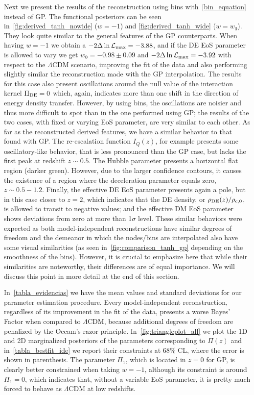 \documentclass[twocolumn,a4paper,reprint,amssymb,aps,prd,groupedaddress,superscriptaddress,nofootinbib]{revtex4-2}
\begin{document}
Next we present the results of the reconstruction using bins with~\cref{bin_equation} instead of GP.
The functional posteriors can be seen in~\cref{fig:derived_tanh_nowide} ($w=-1$) and
\cref{fig:derived_tanh_wide} ($w = w_0$). They look quite similar to the general features of the GP
counterparts. When having $w = -1$ we obtain a $-2\Delta \ln \mathcal{L_{\rm max}} = -3.88$, and if the
DE EoS parameter is allowed to vary  we get $w_0 = -0.98\pm 0.09$ and $-2\Delta\ln \mathcal{L_{\rm max}} = -3.92$
with respect to the $\Lambda$CDM scenario, improving the fit of the data and also performing
slightly similar the reconstruction made with the GP interpolation.
The results for this case also present oscillations around the null value of the interaction kernel
$\Pi_{\rm DE}=0$ which, again, indicates more than one shift in the direction of energy density transfer.
However, by using bins, the oscillations are noisier and thus more difficult to spot than in the one
performed using GP; the results of the two cases, with fixed or varying EoS parameter, are very
similar to each other. As far as the reconstructed derived features, we have a similar behavior to
that found with GP. The re-escalation function $I_Q(z)$, for example presents some oscillatory-like
behavior, that is less pronounced than the GP case, but lacks the first peak at
redshift $z \sim 0.5$. The Hubble parameter presents a horizontal flat region (darker green).
However, due to the larger confidence contours, it causes the existence of a region
where the deceleration parameter equals zero, $z\sim 0.5-1.2$.
Finally, the effective DE EoS parameter presents again a pole, but in this case closer to $z=2$, {which indicates that the DE density, or $\rho_{\rm DE}(z)/\rho_{\rm c,0}$, is allowed to transit to negative values};
and the effective DM EoS parameter shows deviations from zero at more than 1$\sigma$ level.
%
These similar behaviors were expected as both model-independent reconstructions have similar
degrees of freedom and the demeanor in which the nodes/bins are interpolated also have some
visual similarities (as seen in~\cref{fig:comparison_tanh_gp} depending on the smoothness of the bins). {However, it is crucial to emphasize here that while their similarities are noteworthy, their differences are of equal importance. We will discuss this point in more detail at the end of this section.}



In~\cref{tabla_evidencias} we have the mean values and standard deviations for our parameter
estimation procedure. Every model-independent reconstruction, regardless of its improvement in the fit of the data,
presents a worse Bayes' Factor when compared to $\Lambda$CDM, because additional degrees of freedom
are penalized by the Occam's razor principle. In~\cref{fig:triangleplot_all} we plot the 1D and
2D marginalized posteriors of the parameters corresponding to $\Pi(z)$ and in~\cref{tabla_bestfit_ide}
we report their
constraints at 68\% CL, where the error is shown in parenthesis. The parameter $\Pi_1$, which is located in $z=0$ for GP, is clearly better
constrained when taking $w=-1$, although its constraint is around $\Pi_1 = 0$, which indicates
that, without a variable EoS parameter, it is pretty much forced to behave as $\Lambda$CDM at low redshifts.
\end{document}
